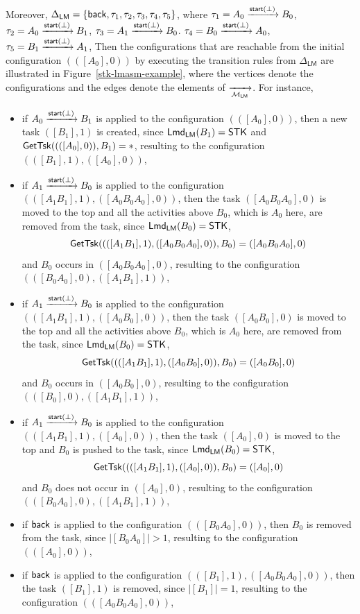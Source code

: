 \begin{example}
Moreover, $\Delta_{\textsf{LM}} = \{{\mathsf{back} },\tau_1, \tau_2, \tau_3, \tau_4, \tau_5\}$, where 
		$\tau_1 = A_0 \xrightarrow{{\mathsf{start} }(\bot)} B_0$,
		$\tau_2 = A_0 \xrightarrow{{\mathsf{start} }(\bot)} B_1$,
		$\tau_3 = A_1 \xrightarrow{{\mathsf{start} }(\bot)} B_0$.
		$\tau_4 = B_0 \xrightarrow{{\mathsf{start} }(\bot)} A_0$,
		$\tau_5 = B_1 \xrightarrow{{\mathsf{start} }(\bot)} A_1$,
	Then the configurations that are reachable from the initial configuration $(([A_0], 0))$ by executing the transition rules from $\Delta_{\textsf{LM}}$ are illustrated in Figure~\ref{stk-lmasm-example}, where the vertices denote the configurations and the edges denote the elements of $\xrightarrow[{\mathcal{M} }_{\textsf{LM}}]{}$. 
	For instance, 
	\begin{itemize}
	\item if $A_0 \xrightarrow{{\mathsf{start} }(\bot)} B_1$ is applied to the configuration $(([A_0],0))$, then a new task $([B_1],1)$ is created, since ${\sf Lmd}_{\textsf{LM}}(B_1) = \mathsf{STK}$ and $\mathsf{GetTsk}((([A_0],0)), B_1) = *$, resulting to the configuration $(([B_1],1),([A_0],0))$,
	\item if $A_1 \xrightarrow{{\mathsf{start} }(\bot)} B_0$ is applied to the configuration $(([A_1B_1],1),([A_0B_0A_0],0))$, then the task $([A_0B_0A_0],0)$ is moved to the top and all the activities above $B_0$, which is $A_0$ here, are removed from the task, since ${\sf Lmd}_{\textsf{LM}}(B_0) = \mathsf{STK}$,
	$$\mathsf{GetTsk}((([A_1B_1],1),([A_0B_0A_0],0)), B_0) = ([A_0B_0A_0],0)$$
	and $B_0$ occurs in $([A_0B_0A_0],0)$, resulting to the configuration $(([B_0A_0],0),([A_1B_1],1))$,
	\item if $A_1 \xrightarrow{{\mathsf{start} }(\bot)} B_0$ is applied to the configuration $(([A_1B_1],1),([A_0B_0],0))$, then the task $([A_0B_0],0)$ is moved to the top and all the activities above $B_0$, which is $A_0$ here, are removed from the task, since ${\sf Lmd}_{\textsf{LM}}(B_0) = \mathsf{STK}$,
	$$\mathsf{GetTsk}((([A_1B_1],1),([A_0B_0],0)), B_0) = ([A_0B_0],0)$$
	and $B_0$ occurs in $([A_0B_0],0)$, resulting to the configuration $(([B_0],0),([A_1B_1],1))$,
	\item if $A_1 \xrightarrow{{\mathsf{start} }(\bot)} B_0$ is applied to the configuration $(([A_1B_1],1),([A_0],0))$, then the task $([A_0],0)$ is moved to the top and $B_0$ is pushed to the task, since ${\sf Lmd}_{\textsf{LM}}(B_0) = \mathsf{STK}$,
	$$\mathsf{GetTsk}((([A_1B_1],1),([A_0],0)), B_0) = ([A_0],0)$$
	and $B_0$ does not occur in $([A_0],0)$, resulting to the configuration $(([B_0A_0],0),([A_1B_1],1))$,
	\item if ${\mathsf{back} }$ is applied to the configuration $(([B_0A_0], 0))$, then $B_0$ is removed from the task, since $|[B_0A_0]|  > 1$, resulting to the configuration $(([A_0], 0))$,
	\item if ${\mathsf{back} }$ is applied to the configuration $(([B_1],1),([A_0B_0A_0],0))$, then the task $([B_1], 1)$ is removed, since $|[B_1]| = 1$, resulting to the configuration $(([A_0B_0A_0], 0))$,


\end{itemize}
\end{example}
